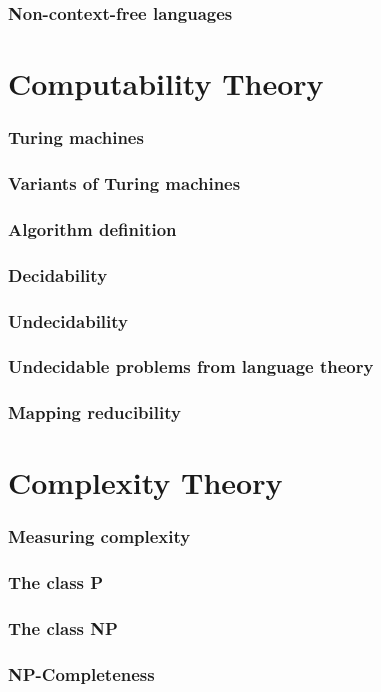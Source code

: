 \documentclass[11pt]{article}
\begin{document}
\subsubsection{Non-context-free languages}

\section{Computability Theory}
\subsubsection{Turing machines}
\subsubsection{Variants of Turing machines}
\subsubsection{Algorithm definition}
\subsubsection{Decidability}
\subsubsection{Undecidability}
\subsubsection{Undecidable problems from language theory}
\subsubsection{Mapping reducibility}

\section{Complexity Theory}
\subsubsection{Measuring complexity}
\subsubsection{The class P}
\subsubsection{The class NP}
\subsubsection{NP-Completeness}
\end{document}
